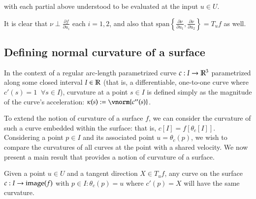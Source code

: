 	  with each partial above understood to be evaluated at the input $u \in U$.
	  
	  It is clear that $\nu \perp \frac{\partial f}{\partial u_i}$ each $i=1,2$, and also that
	  $\textrm{span}\left\{ \frac{\partial \nu}{\partial u_1}, \frac{\partial \nu}{\partial u_2}\right\} = T_u f$ as well.
        \subsection{Defining normal curvature of a surface}
        In the context of a regular arc-length parametrized curve $c: I \to \mathbb{R}^3$ parametrized along some closed interval $I\in \mathbb{R}$
	        (that is, a differentiable, one-to-one curve where $c'(s) = 1 \;\; \forall s \in I$), curvature at a point $s \in I$ is defined simply as the magnitude of the curve's acceleration: $\kappa(s) := \vnorm{c''(s)}$.
	    
	    To extend the notion of curvature of a surface $f$, we can consider the curvature of such a curve embedded within the surface: that is, $c[I] = f[\theta_c[I]]$. Considering a point $p \in I$ and its associated point $u = \theta_c(p)$, we wish to compare the curvatures of all curves at the point with a shared velocity. We now present a main result that provides a notion of curvature of a surface.
		
		\begin{theorem}
			Given a point $u \in U $ and a tangent direction $X \in T_u f$,
		    any curve on the surface $c: I \to \mathrm{image}(f)$ with $p\in I : \theta_c(p) = u$
		    where $c'(p) = X$ will have the same curvature.
		\end{theorem}
		
